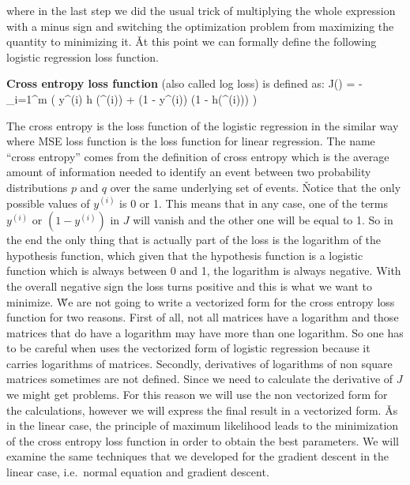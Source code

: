 where in the last step we did the usual trick of multiplying the whole expression with a minus sign and switching the
optimization problem from maximizing the quantity to minimizing it. \v

At this point we can formally define the following logistic regression loss function.

\textbf{Cross entropy loss function} (also called log loss) is defined as:
\bse
J() = -  \sum_{i=1}^{m} \Big( y^{(i)} \cdot \ln h (^{(i)}) + (1 - {y^{(i)}})
\cdot \ln (1 - h(^{(i)})) \Big)
\ese
\ed

The cross entropy is the loss function of the logistic regression in the similar way where MSE loss function is the
loss function for linear regression. The name ``cross entropy'' comes from the definition of cross entropy which is
the average amount of information needed to identify an event between two probability distributions $p$ and $q$ over
the same underlying set of events. \v

Notice that the only possible values of $y^{(i)}$ is 0 or 1. This means that in any case, one of the terms $y^{(i)}$
or $(1-y^{(i)})$ in $J$ will vanish and the other one will be equal to 1. So in the end the only thing that is
actually part of the loss is the logarithm of the hypothesis function, which given that the hypothesis function is a
logistic function which is always between 0 and 1, the logarithm is always negative. With the overall negative sign
the loss turns positive and this is what we want to minimize. \v

We are not going to write a vectorized form for the cross entropy loss function for two reasons. First of all, not
all matrices have a logarithm and those matrices that do have a logarithm may have more than one logarithm. So one
has to be careful when uses the vectorized form of logistic regression because it carries logarithms of matrices.
Secondly, derivatives of logarithms of non square matrices sometimes are not defined. Since we need to calculate the
derivative of $J$ we might get problems. For this reason we will use the non vectorized form for the calculations,
however we will express the final result in a vectorized form. \v

As in the linear case, the principle of maximum likelihood leads to the minimization of the cross entropy loss
function in order to obtain the best parameters. We will examine the same techniques that we developed for the
gradient descent in the linear case, i.e.\ normal equation and gradient descent.

